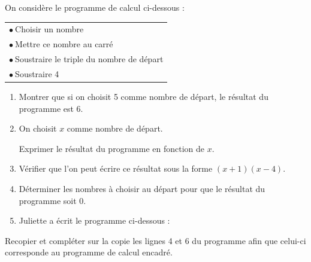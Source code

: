 \documentclass[exercice,a4]{thedocument}%
\begin{document}
%

\medskip

On considère le programme de calcul ci-dessous :

\begin{center}
\begin{tabular}{|l|}\hline
$\bullet~$Choisir un nombre\\
$\bullet~$Mettre ce nombre au carré\\
$\bullet~$Soustraire le triple du nombre de départ\\
$\bullet~$Soustraire 4\\ \hline
\end{tabular}
\end{center}

\smallskip

\begin{enumerate}
\item Montrer que si on choisit 5 comme nombre de départ, le résultat du programme est 6.
\item On choisit $x$ comme nombre de départ.

Exprimer le résultat du programme en fonction de $x$.
\item Vérifier que l'on peut écrire ce résultat sous la forme $(x + 1)(x - 4)$.
\item Déterminer les nombres à choisir au départ pour que le résultat du programme soit 0.
\item Juliette a écrit le programme ci-dessous :

\begin{scratch}
\end{scratch}
\end{enumerate}

\medskip

Recopier et compléter sur la copie les lignes 4 et 6 du programme afin que celui-ci corresponde au programme de calcul encadré.

\bigskip
\showthesource
\end{document}
